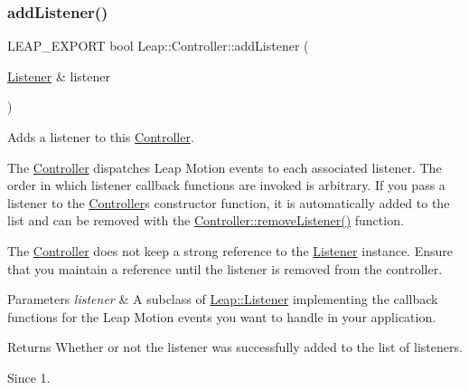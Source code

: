\subsubsection{\texorpdfstring{add\+Listener()}{addListener()}}
{\footnotesize\ttfamily L\+E\+A\+P\+\_\+\+E\+X\+P\+O\+RT bool Leap\+::\+Controller\+::add\+Listener (\begin{DoxyParamCaption}\item[{\hyperlink{class_leap_1_1_listener}{Listener} \&}]{listener }\end{DoxyParamCaption})}

Adds a listener to this \hyperlink{class_leap_1_1_controller}{Controller}.

The \hyperlink{class_leap_1_1_controller}{Controller} dispatches Leap Motion events to each associated listener. The order in which listener callback functions are invoked is arbitrary. If you pass a listener to the \hyperlink{class_leap_1_1_controller}{Controller}\textquotesingle{}s constructor function, it is automatically added to the list and can be removed with the \hyperlink{class_leap_1_1_controller_a1a48d46f317f0368cc8f7b0ebfd77728}{Controller\+::remove\+Listener()} function.


\begin{DoxyCodeInclude}
\end{DoxyCodeInclude}


The \hyperlink{class_leap_1_1_controller}{Controller} does not keep a strong reference to the \hyperlink{class_leap_1_1_listener}{Listener} instance. Ensure that you maintain a reference until the listener is removed from the controller.


\begin{DoxyParams}{Parameters}
{\em listener} & A subclass of \hyperlink{class_leap_1_1_listener}{Leap\+::\+Listener} implementing the callback functions for the Leap Motion events you want to handle in your application. \\
\hline
\end{DoxyParams}
\begin{DoxyReturn}{Returns}
Whether or not the listener was successfully added to the list of listeners. 
\end{DoxyReturn}
\begin{DoxySince}{Since}
1. 
\end{DoxySince}
\mbox{\label{class_leap_1_1_controller_a8640acf31dfcb70a86329f79f0a9efc0}} 
